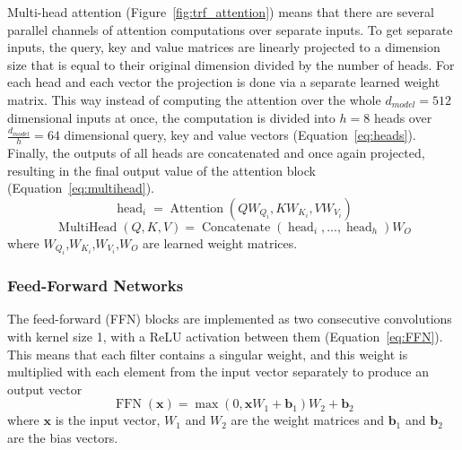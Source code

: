 \documentclass[12pt]{article}
\DeclareMathOperator{\Attention}{Attention}
\DeclareMathOperator{\MultiHead}{MultiHead}
\DeclareMathOperator{\Concatenate}{Concatenate}
\DeclareMathOperator{\head}{head}
\DeclareMathOperator{\FFN}{FFN}
\begin{document}
Multi-head attention (Figure~\ref{fig:trf_attention}) means that there are several parallel channels of attention computations over separate inputs. To get separate inputs, the query, key and value matrices are linearly projected to a dimension size that is equal to their original dimension divided by the number of heads. For each head and each vector the projection is done via a separate learned weight matrix. This way instead of computing the attention over the whole \(d_{model}=512\) dimensional inputs at once, the computation is divided into \(h=8\) heads over \(\frac{d_{model}}{h}=64\) dimensional query, key and value vectors (Equation~\ref{eq:heads}). Finally, the outputs of all heads are concatenated and once again projected, resulting in the final output value of the attention block (Equation~\ref{eq:multihead}).
\begin{equation}\label{eq:heads}
\head_i=\Attention(QW_{Q_i},KW_{K_i},VW_{V_i})
\end{equation}
\begin{equation} \label{eq:multihead}
\MultiHead(Q,K,V)=\Concatenate(\head_i,...,\head_h)W_O
\end{equation}
where \(W_{Q_i}\),\(W_{K_i}\),\(W_{V_i}\),\(W_{O}\) are learned weight matrices.

\subsubsection{Feed-Forward Networks} \label{sssec:trf_nn}
The feed-forward (FFN) blocks are implemented as two consecutive convolutions with kernel size 1, with a ReLU activation between them (Equation~\ref{eq:FFN}). This means that each filter contains a singular weight, and this weight is multiplied with each element from the input vector separately to produce an output vector
\begin{equation} \label{eq:FFN}
\FFN(\bm{x})=\max(0,\bm{x}W_1+\bm{b}_1)W_2+\bm{b}_2
\end{equation}
where \(\bm{x}\) is the input vector, \(W_1\) and \(W_2\) are the weight matrices and \(\bm{b}_1\) and \(\bm{b}_2\) are the bias vectors.
\end{document}
